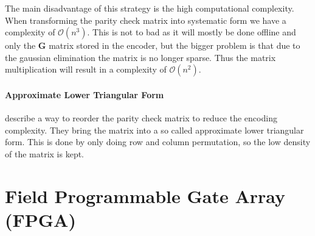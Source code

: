 The main disadvantage of this strategy is the high computational complexity. When transforming the parity check matrix into systematic form we have a complexity of $\mathcal{O}(n^3)$. This is not to bad as it will mostly be done offline and only the $\bm{G}$ matrix stored in the encoder, but the bigger problem is that due to the gaussian elimination the matrix is no longer sparse. Thus the matrix multiplication will result in a complexity of $\mathcal{O}(n^2)$\cite{QiGo07}. 

\subsubsection{Approximate Lower Triangular Form}
\cite{RiUr01} describe a way to reorder the parity check matrix to reduce the encoding complexity. They bring the matrix into a so called approximate lower triangular form. This is done by only doing row and column permutation, so the low density of the matrix is kept.

\begin{figure}
	\centering
\end{figure}

\chapter{Field Programmable Gate Array (FPGA)}
